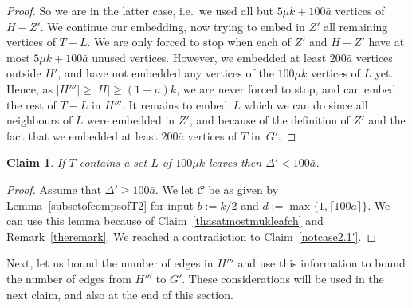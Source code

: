 \documentclass[12pt]{article}
\newtheorem{claim}[theorem]{Claim}
\begin{document}
\begin{proof}
    So we are in 
     the latter case, i.e.~we used all but $5\mu k+100\bar a$ vertices of $H-Z'$. We continue our embedding, now trying to embed in $Z'$ all remaining vertices of $T-L$. We are only forced to stop when each of $Z'$ and $H-Z'$ have at most  $5\mu k+100\bar a$ unused vertices. However, we embedded at least $200\bar a$ vertices outside $H'$, and have not embedded any    vertices of the $100\mu k$ vertices of  $L$ yet. Hence, as $|H'''|\ge |H|\ge (1-\mu )k$, we are never forced to stop, and can embed the rest of $T-L$ in $H'''$.
     It remains to embed~$L$ which we can do since all neighbours of $L$ were embedded in $Z'$, and because of the definition of $Z'$ and the fact that we  embedded at least $200\bar a$ vertices of $T$ in~$G'$.
     \end{proof}

               \begin{claim}\label{notcase2.1}
     If $T$ contains a set $L$ of  $100\mu k$ leaves then  $\Delta'< 100\bar a$. 
         \end{claim}
                 \begin{proof} 
                  Assume that $\Delta'\ge 100\bar a$. 
We let $\mathcal C$ be as given by Lemma~\ref{subsetofcompsofT2} 
 for input 
$b:=k/2$ and $d:=\max\{1,\lceil100\bar a\rceil\}$. We can use this lemma because of Claim~\ref{thasatmostmukleafch} and Remark~\ref{theremark}. We reached a contradiction to Claim~\ref{notcase2.1'}.
             \end{proof}
             
             
             
                   Next, let us bound the number of edges in $H'''$ and use this information to bound the number of edges from  $H'''$ to $G'$. These considerations will be used in the next claim, and also at the end of this section.
                   
\end{document}
